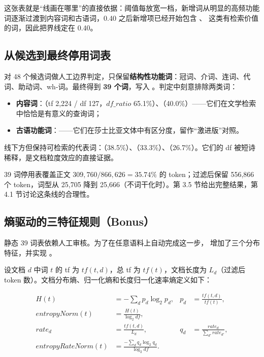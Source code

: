 这张表就是“线画在哪里”的直接依据：阈值每放宽一档，新增词从明显的高频功能词逐渐过渡到内容词和古语词，0.40 之后新增项已经开始包含 、 这类有检索价值的词，因此把界线定在 0.40。

\subsection{从候选到最终停用词表}

对 48 个候选词做人工边界判定，只保留\textbf{结构性功能词}：冠词、介词、连词、代词、助动词、wh-词。最终得到 \textbf{39 个词}，写入 。判定中刻意排除两类词：

\begin{itemize}
  \item \textbf{内容词}：（tf 2,224 / df 127，$df\_ratio$ 65.1\%）、（40.0\%）——它们在文学检索中恰恰是有意义的查询词；
  \item \textbf{古语功能词}：——它们在莎士比亚文体中有区分度，留作“激进版”对照。
\end{itemize}

线下方但保持可检索的代表词：（38.5\%）、（33.3\%）、（26.7\%）。它们的 df 被短诗稀释，是文档粒度效应的直接证据。

39 词停用表覆盖正文 $309{,}760 / 866{,}626 = 35.74\%$ 的 token；过滤后保留 556,866 个 token，词型从 25,705 降到 25,666（不词干化时）。第 3.5 节给出完整结果，第 4.1 节讨论这条线的合理性。

\subsection{熵驱动的三特征规则（Bonus）}

静态 39 词表依赖人工审核。为了在任意语料上自动完成这一步， 增加了三个分布特征，并实现 。

设文档 $d$ 中词 $t$ 的 tf 为 $tf(t,d)$，总 tf 为 $tf(t)$，文档长度为 $L_d$（过滤后 token 数）。文档分布熵、归一化熵和长度归一化速率熵定义如下：

\begin{align}
  H(t) &= -\sum_d p_d \log_2 p_d,
  & p_d &= \frac{tf(t,d)}{tf(t)}, \\
  \mathit{entropyNorm}(t) &= \frac{H(t)}{\log_2 df}, \\
  rate_d &= \frac{tf(t,d)}{L_d},
  & q_d &= \frac{rate_d}{\sum_{d'} rate_{d'}}, \\
  \mathit{entropyRateNorm}(t) &= \frac{-\sum_d q_d \log_2 q_d}{\log_2 df}.
\end{align}

